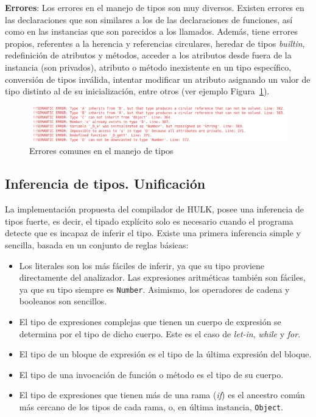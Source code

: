 \documentclass{llncs}
\begin{document}
\textbf{Errores}: Los errores en el manejo de tipos son muy diversos. Existen errores en las declaraciones que son similares a los de las declaraciones de funciones, así como en las instancias que son parecidos a los llamados. Además, tiene errores propios, referentes a la herencia y referencias circulares, 
heredar de tipos \textit{builtin}, redefinición de atributos y métodos, acceder a los atributos desde fuera de la instancia (son privados), atributo o método inexistente en un tipo específico, conversión de tipos inválida, intentar modificar un atributo asignando un valor de tipo distinto al de su inicialización, 
entre otros (ver ejemplo Figura~\ref{fig:errores_5}).
\begin{figure}[h]
\centering
\includegraphics[width=1\textwidth]{images/type_errors.png}
\caption{Errores comunes en el manejo de tipos}
\label{fig:errores_5}
\end{figure}

\subsection{Inferencia de tipos. Unificación}

La implementación propuesta del compilador de HULK, posee una inferencia de tipos fuerte, es decir, el tipado explícito solo es necesario cuando el programa detecte que es incapaz de inferir el tipo. Existe una primera inferencia simple y sencilla, basada en un conjunto de reglas básicas: 
\begin{itemize}
    \item Los literales son los más fáciles de inferir, ya que su tipo proviene directamente del analizador. Las expresiones aritméticas también son fáciles, ya que su tipo siempre es \texttt{Number}. Asimismo, los operadores de cadena y booleanos son sencillos.
    \item El tipo de expresiones complejas que tienen un cuerpo de expresión se determina por el tipo de dicho cuerpo. Este es el caso de \textit{let-in}, \textit{while} y \textit{for}.
    \item El tipo de un bloque de expresión es el tipo de la última expresión del bloque.
    \item El tipo de una invocación de función o método es el tipo de su cuerpo.
    \item El tipo de expresiones que tienen más de una rama (\textit{if}) es el ancestro común más cercano de los tipos de cada rama, o, en última instancia, \texttt{Object}.
\end{itemize}
\end{document}
